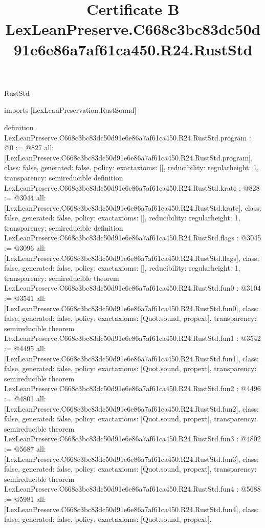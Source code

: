 \begin{lexlean}{RustStd}
\title{Certificate B LexLeanPreserve.C668c3bc83dc50d91e6e86a7af61ca450.R24.RustStd}
\begin{coremodule}
imports [LexLeanPreservation.RustSound]

definition LexLeanPreserve.C668c3bc83dc50d91e6e86a7af61ca450.R24.RustStd.program : @0 := @827 {
  all: [LexLeanPreserve.C668c3bc83dc50d91e6e86a7af61ca450.R24.RustStd.program],
  class: false,
  generated: false,
  policy: exact{axioms: []},
  reducibility: regular{height: 1},
  transparency: semireducible
}
definition LexLeanPreserve.C668c3bc83dc50d91e6e86a7af61ca450.R24.RustStd.krate : @828 := @3044 {
  all: [LexLeanPreserve.C668c3bc83dc50d91e6e86a7af61ca450.R24.RustStd.krate],
  class: false,
  generated: false,
  policy: exact{axioms: []},
  reducibility: regular{height: 1},
  transparency: semireducible
}
definition LexLeanPreserve.C668c3bc83dc50d91e6e86a7af61ca450.R24.RustStd.flags : @3045 := @3096 {
  all: [LexLeanPreserve.C668c3bc83dc50d91e6e86a7af61ca450.R24.RustStd.flags],
  class: false,
  generated: false,
  policy: exact{axioms: []},
  reducibility: regular{height: 1},
  transparency: semireducible
}
theorem LexLeanPreserve.C668c3bc83dc50d91e6e86a7af61ca450.R24.RustStd.fun0 : @3104 := @3541 {
  all: [LexLeanPreserve.C668c3bc83dc50d91e6e86a7af61ca450.R24.RustStd.fun0],
  class: false,
  generated: false,
  policy: exact{axioms: [Quot.sound, propext]},
  transparency: semireducible
}
theorem LexLeanPreserve.C668c3bc83dc50d91e6e86a7af61ca450.R24.RustStd.fun1 : @3542 := @4495 {
  all: [LexLeanPreserve.C668c3bc83dc50d91e6e86a7af61ca450.R24.RustStd.fun1],
  class: false,
  generated: false,
  policy: exact{axioms: [Quot.sound, propext]},
  transparency: semireducible
}
theorem LexLeanPreserve.C668c3bc83dc50d91e6e86a7af61ca450.R24.RustStd.fun2 : @4496 := @4801 {
  all: [LexLeanPreserve.C668c3bc83dc50d91e6e86a7af61ca450.R24.RustStd.fun2],
  class: false,
  generated: false,
  policy: exact{axioms: [Quot.sound, propext]},
  transparency: semireducible
}
theorem LexLeanPreserve.C668c3bc83dc50d91e6e86a7af61ca450.R24.RustStd.fun3 : @4802 := @5687 {
  all: [LexLeanPreserve.C668c3bc83dc50d91e6e86a7af61ca450.R24.RustStd.fun3],
  class: false,
  generated: false,
  policy: exact{axioms: [Quot.sound, propext]},
  transparency: semireducible
}
theorem LexLeanPreserve.C668c3bc83dc50d91e6e86a7af61ca450.R24.RustStd.fun4 : @5688 := @5981 {
  all: [LexLeanPreserve.C668c3bc83dc50d91e6e86a7af61ca450.R24.RustStd.fun4],
  class: false,
  generated: false,
  policy: exact{axioms: [Quot.sound, propext]},
}
\end{coremodule}
\end{lexlean}
